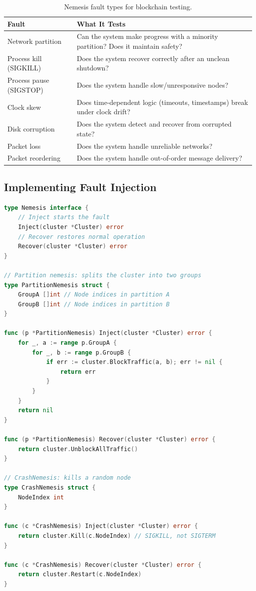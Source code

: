 \begin{table}[H]
\centering
\small
\begin{tabular}{@{}lp{8cm}@{}}
\toprule
\textbf{Fault} & \textbf{What It Tests} \\
\midrule
Network partition & Can the system make progress with a minority partition? Does it maintain safety? \\
Process kill (SIGKILL) & Does the system recover correctly after an unclean shutdown? \\
Process pause (SIGSTOP) & Does the system handle slow/unresponsive nodes? \\
Clock skew & Does time-dependent logic (timeouts, timestamps) break under clock drift? \\
Disk corruption & Does the system detect and recover from corrupted state? \\
Packet loss & Does the system handle unreliable networks? \\
Packet reordering & Does the system handle out-of-order message delivery? \\
\bottomrule
\end{tabular}
\caption{Nemesis fault types for blockchain testing.}
\end{table}

\subsection{Implementing Fault Injection}

\begin{lstlisting}[language=Go,caption={Fault injection test framework}]
type Nemesis interface {
    // Inject starts the fault
    Inject(cluster *Cluster) error
    // Recover restores normal operation
    Recover(cluster *Cluster) error
}

// Partition nemesis: splits the cluster into two groups
type PartitionNemesis struct {
    GroupA []int // Node indices in partition A
    GroupB []int // Node indices in partition B
}

func (p *PartitionNemesis) Inject(cluster *Cluster) error {
    for _, a := range p.GroupA {
        for _, b := range p.GroupB {
            if err := cluster.BlockTraffic(a, b); err != nil {
                return err
            }
        }
    }
    return nil
}

func (p *PartitionNemesis) Recover(cluster *Cluster) error {
    return cluster.UnblockAllTraffic()
}

// CrashNemesis: kills a random node
type CrashNemesis struct {
    NodeIndex int
}

func (c *CrashNemesis) Inject(cluster *Cluster) error {
    return cluster.Kill(c.NodeIndex) // SIGKILL, not SIGTERM
}

func (c *CrashNemesis) Recover(cluster *Cluster) error {
    return cluster.Restart(c.NodeIndex)
}
\end{lstlisting}

